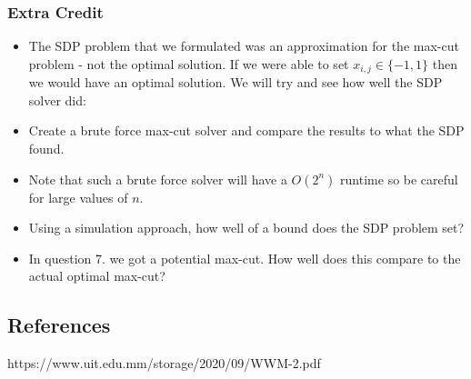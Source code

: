 \documentclass{article}
\begin{document}
\subsubsection{Extra Credit}
\begin{itemize}
\item\label{item:1} The SDP problem that we formulated was an approximation for the max-cut problem - not the optimal solution. If we were able to set \( x_{i, j} \in \{ -1, 1 \} \) then we would have an optimal solution. We will try and see how well the SDP solver did:
\item\label{item:2}
Create a brute force max-cut solver and compare the results to what the SDP found.
\item\label{item:3}
Note that such a brute force solver will have a \( O(2^n) \) runtime so be careful for large values of \( n \).
\item\label{item:4}
Using a simulation approach, how well of a bound does the SDP problem set?
\item\label{item:5}
In question 7. we got a potential max-cut. How well does this compare to the actual optimal max-cut?
\end{itemize}



\newpage
\subsection{References}
https://www.uit.edu.mm/storage/2020/09/WWM-2.pdf
\end{document}
